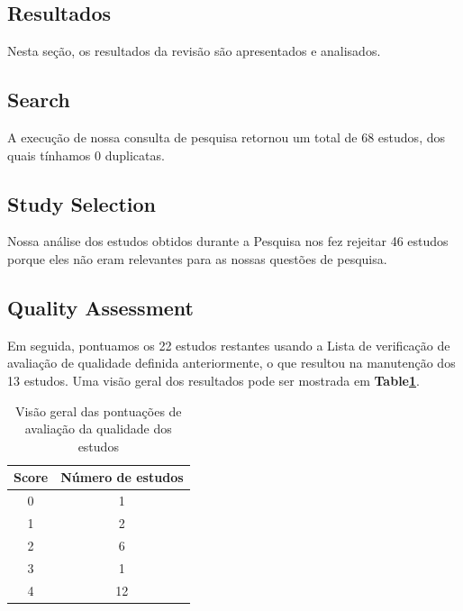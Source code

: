 \subsection{Resultados}

Nesta seção, os resultados da revisão são apresentados e analisados.

\subsection{Search}
A execução de nossa consulta de pesquisa retornou um total de 68 estudos, dos quais tínhamos 0 duplicatas.

\subsection{Study Selection}
Nossa análise dos estudos obtidos durante a Pesquisa nos fez rejeitar 46 estudos porque eles não eram relevantes para as nossas questões de pesquisa.

\subsection{Quality Assessment}
Em seguida, pontuamos os 22 estudos restantes usando a Lista de verificação de avaliação de qualidade definida anteriormente, o que resultou na manutenção dos 13 estudos. Uma visão geral dos resultados pode ser mostrada em \textbf{Table\ref{tab:quality_assessment}}.

\begin{table}[ht]
    \centering
        \caption{Visão geral das pontuações de avaliação da qualidade dos estudos}
        \begin{tabular}{c|c}
            \hline
                \textbf{Score} & \textbf{Número de estudos} \\
            \hline
            \hline
                0 & 
                1 \\
            \hline
                1 & 
                2 \\
            \hline
                2 & 
                6 \\
            \hline
                3 & 
                1 \\
            \hline
                4 & 
                12 \\
            \hline
        \end{tabular}
    \label{tab:quality_assessment}
\end{table}

